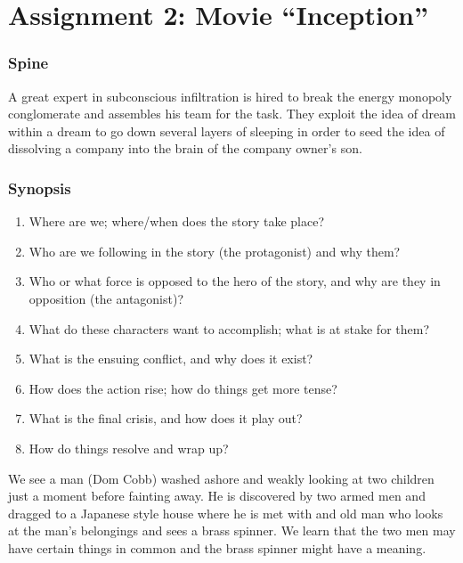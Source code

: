 \documentclass{article}
\begin{document}
\section*{Assignment 2: Movie ``Inception''}

\subsubsection*{Spine}

A great expert in subconscious infiltration is hired to break the energy
monopoly conglomerate and assembles his team for the task. They exploit the idea
of dream within a dream to go down several layers of sleeping in order to seed
the idea of dissolving a company into the brain of the company owner's son.

\subsubsection*{Synopsis}

\begin{enumerate}

  \item Where are we; where/when does the story take place?

  \item Who are we following in the story (the protagonist) and why them?

  \item Who or what force is opposed to the hero of the story, and why are they
    in opposition (the antagonist)?

  \item What do these characters want to accomplish; what is at stake for them?

  \item What is the ensuing conflict, and why does it exist?

  \item How does the action rise; how do things get more tense?

  \item What is the final crisis, and how does it play out?

  \item How do things resolve and wrap up?

\end{enumerate}

We see a man (Dom Cobb) washed ashore and weakly looking at two children just a
moment before fainting away. He is discovered by two armed men and dragged to a
Japanese style house where he is met with and old man who looks at the man's
belongings and sees a brass spinner.
We learn that the two men may have certain things in common and the brass
spinner might have a meaning.
\end{document}
